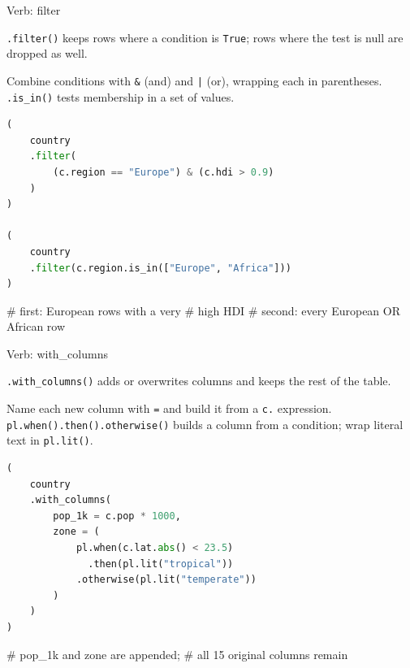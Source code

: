 \documentclass[8pt,aspectratio=169]{beamer}
\begin{document}
\begin{frame}[fragile]{Verb: filter}
\begin{splitcode}{%

\texttt{.filter()} keeps rows where a condition is \texttt{True}; rows where the test is null are dropped as well.

Combine conditions with \texttt{\&} (and) and \texttt{|} (or), wrapping each in parentheses. \texttt{.is\_in()} tests membership in a set of values.

}
\begin{lstlisting}[language=Python]
(
    country
    .filter(
        (c.region == "Europe") & (c.hdi > 0.9)
    )
)

(
    country
    .filter(c.region.is_in(["Europe", "Africa"]))
)
\end{lstlisting}
\begin{codeoutput}
# first: European rows with a very
# high HDI
# second: every European OR African row
\end{codeoutput}
\end{splitcode}
\end{frame}

\begin{frame}[fragile]{Verb: with\_columns}
\begin{splitcode}{%

\texttt{.with\_columns()} adds or overwrites columns and keeps the rest of the table.

Name each new column with \texttt{=} and build it from a \texttt{c.} expression. \texttt{pl.when().then().otherwise()} builds a column from a condition; wrap literal text in \texttt{pl.lit()}.

}
\begin{lstlisting}[language=Python]
(
    country
    .with_columns(
        pop_1k = c.pop * 1000,
        zone = (
            pl.when(c.lat.abs() < 23.5)
              .then(pl.lit("tropical"))
            .otherwise(pl.lit("temperate"))
        )
    )
)
\end{lstlisting}
\begin{codeoutput}
# pop_1k and zone are appended;
# all 15 original columns remain
\end{codeoutput}
\end{splitcode}
\end{frame}
\end{document}
